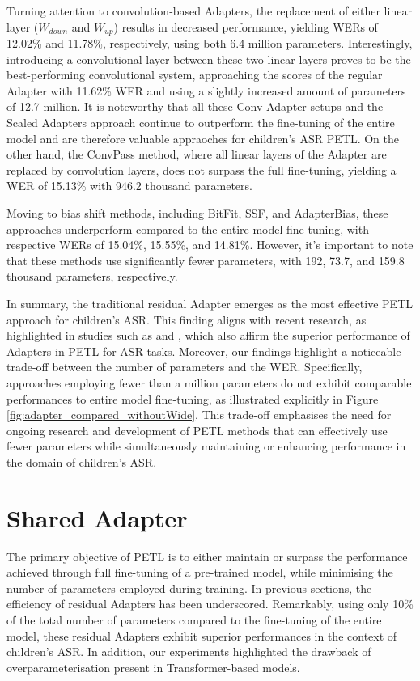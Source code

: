 Turning attention to convolution-based Adapters, the replacement of either linear layer ($W_{down}$ and $W_{up}$) results in decreased performance, yielding WERs of 12.02\% and 11.78\%, respectively, using both 6.4 million parameters. Interestingly, introducing a convolutional layer between these two linear layers proves to be the best-performing convolutional system, approaching the scores of the regular Adapter with 11.62\% WER and using a slightly increased amount of parameters of 12.7 million. It is noteworthy that all these Conv-Adapter setups and the Scaled Adapters approach continue to outperform the fine-tuning of the entire model and are therefore valuable appraoches for children's ASR PETL.
On the other hand, the ConvPass method, where all linear layers of the Adapter are replaced by convolution layers, does not surpass the full fine-tuning, yielding a WER of 15.13\% with 946.2 thousand parameters.

Moving to bias shift methods, including BitFit, SSF, and AdapterBias, these approaches underperform compared to the entire model fine-tuning, with respective WERs of 15.04\%, 15.55\%, and 14.81\%. However, it's important to note that these methods use significantly fewer parameters, with 192, 73.7, and 159.8 thousand parameters, respectively.

In summary, the traditional residual Adapter emerges as the most effective PETL approach for children's ASR. This finding aligns with recent research, as highlighted in studies such as \cite{li2023evaluating} and \cite{cappellazzo2023parameter}, which also affirm the superior performance of Adapters in PETL for ASR tasks. Moreover, our findings highlight a noticeable trade-off between the number of parameters and the WER. Specifically, approaches employing fewer than a million parameters do not exhibit comparable performances to entire model fine-tuning, as illustrated explicitly in Figure \ref{fig:adapter_compared_withoutWide}. This trade-off emphasises the need for ongoing research and development of PETL methods that can effectively use fewer parameters while simultaneously maintaining or enhancing performance in the domain of children's ASR.

\section{Shared Adapter}
The primary objective of PETL is to either maintain or surpass the performance achieved through full fine-tuning of a pre-trained model, while minimising the number of parameters employed during training. In previous sections, the efficiency of residual Adapters has been underscored. Remarkably, using only 10\% of the total number of parameters compared to the fine-tuning of the entire model, these residual Adapters exhibit superior performances in the context of children's ASR. In addition, our experiments highlighted the drawback of overparameterisation present in Transformer-based models.

